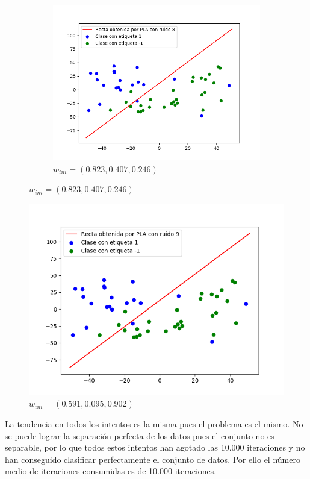 \documentclass[12pt,a4paper]{article}
\begin{document}
\begin{figure}[H]
\begin{subfigure}{0.33\textwidth}
		\includegraphics[scale=0.37]{./Imagenes/ej2-21.png}
		\caption{$w_{ini} = (0.823,0.407,0.246)$}
	\end{subfigure}
\end{figure}

\begin{figure}[H]
	\centering
	\includegraphics[scale=0.37]{./Imagenes/ej2-22.png}
	\caption{$w_{ini} = (0.591,0.095,0.902)$}
\end{figure}

La tendencia en todos los intentos es la misma pues el problema es el mismo. No se puede lograr la separación perfecta de los datos pues el conjunto no es separable, por lo que todos estos intentos han agotado las 10.000 iteraciones y no han conseguido clasificar perfectamente el conjunto de datos. Por ello el número medio de iteraciones consumidas es de 10.000 iteraciones.
\end{document}
